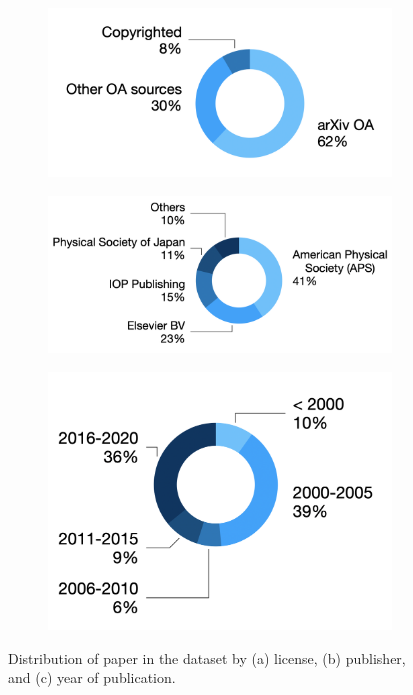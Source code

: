 \documentclass[fleqn,10pt]{wlscirep}
\begin{document}
\begin{figure}[ht]
\begin{subfigure}{0.3\textwidth}
     \centering
    \includegraphics[width=\linewidth]{papers-by-sources.png}
    \label{fig:arxiv-rate}
\end{subfigure}
\begin{subfigure}{0.4\textwidth}
     \centering
    \includegraphics[width=\linewidth]{papers-by-publishers.png}
    \label{fig:distribution-by-publisher}
\end{subfigure}
\begin{subfigure}{0.3\textwidth}
\centering
    \includegraphics[width=\linewidth]{papers-by-years.png}
    \label{fig:distribution-by-year}
\end{subfigure}
\caption{Distribution of paper in the dataset by (a) license, (b) publisher, and (c) year of publication.}
\label{fig:dataset-distributions}
\end{figure}
\end{document}
